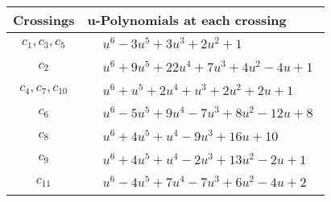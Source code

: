 \documentclass[1p]{elsarticle_modified}
\theoremstyle{definition}
\begin{document}
\begin{tabular}{m{50pt}|m{274pt}}
Crossings & \hspace{64pt}u-Polynomials at each crossing \\
\hline $$\begin{aligned}c_{1},c_{3},c_{5}\end{aligned}$$&$\begin{aligned}
&u^6-3 u^5+3 u^3+2 u^2+1
\end{aligned}$\\
\hline $$\begin{aligned}c_{2}\end{aligned}$$&$\begin{aligned}
&u^6+9 u^5+22 u^4+7 u^3+4 u^2-4 u+1
\end{aligned}$\\
\hline $$\begin{aligned}c_{4},c_{7},c_{10}\end{aligned}$$&$\begin{aligned}
&u^6+u^5+2 u^4+u^3+2 u^2+2 u+1
\end{aligned}$\\
\hline $$\begin{aligned}c_{6}\end{aligned}$$&$\begin{aligned}
&u^6-5 u^5+9 u^4-7 u^3+8 u^2-12 u+8
\end{aligned}$\\
\hline $$\begin{aligned}c_{8}\end{aligned}$$&$\begin{aligned}
&u^6+4 u^5+u^4-9 u^3+16 u+10
\end{aligned}$\\
\hline $$\begin{aligned}c_{9}\end{aligned}$$&$\begin{aligned}
&u^6+4 u^5+u^4-2 u^3+13 u^2-2 u+1
\end{aligned}$\\
\hline $$\begin{aligned}c_{11}\end{aligned}$$&$\begin{aligned}
&u^6-4 u^5+7 u^4-7 u^3+6 u^2-4 u+2
\end{aligned}$\\
\hline
\end{tabular}\\~\\
\newpage\renewcommand{\arraystretch}{1}
\end{document}
